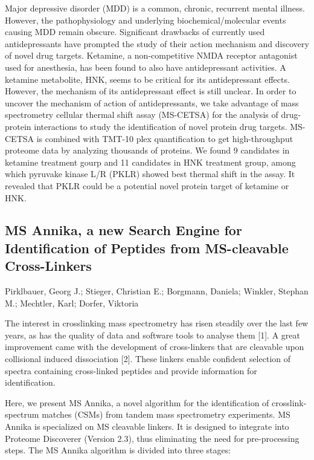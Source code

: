 {Major depressive disorder (MDD) is a common, chronic, recurrent mental illness. However, the pathophysiology and underlying biochemical/molecular events causing MDD remain obscure. Significant drawbacks of currently used antidepressants have prompted the study of their action mechanism and discovery of novel drug targets. Ketamine, a non-competitive NMDA receptor antagonist used for anesthesia, has been found to also have antidepressant activities. A ketamine metabolite, HNK, seems to be critical for its antidepressant effects. However, the mechanism of its antidepressant effect is still unclear. In order to uncover the mechanism of action of antidepressants, we take advantage of mass spectrometry cellular thermal shift assay (MS-CETSA) for the analysis of drug-protein interactions to study the identification of novel protein drug targets. MS-CETSA is combined with TMT-10 plex quantification to get high-throughput proteome data by analyzing thousands of proteins. We found 9 candidates in ketamine treatment gourp and 11 candidates in HNK treatment group, among which pyruvake kinase L/R (PKLR) showed best thermal shift in the assay. It revealed that PKLR could be a potential novel protein target of ketamine or HNK.


\subsection*{\color{eubicRed} MS Annika, a new Search Engine for Identification of Peptides from MS-cleavable Cross-Linkers}
{\color{eubicGray}Pirklbauer, Georg J.;
Stieger, Christian E.;
Borgmann, Daniela;
Winkler, Stephan M.;
Mechtler, Karl;
Dorfer, Viktoria}

The interest in crosslinking mass spectrometry has risen steadily over the last few years, as has the quality of data and software tools to analyse them [1]. A great improvement came with the development of cross-linkers that are cleavable upon collisional induced dissociation [2]. These linkers enable confident selection of spectra containing cross-linked peptides and provide information for identification.

Here, we present MS Annika, a novel algorithm for the identification of crosslink-spectrum matches (CSMs) from tandem mass spectrometry experiments. MS Annika is specialized on MS cleavable linkers. It is designed to integrate into Proteome Discoverer (Version 2.3), thus eliminating the need for pre-processing steps. The MS Annika algorithm is divided into three stages:

}
